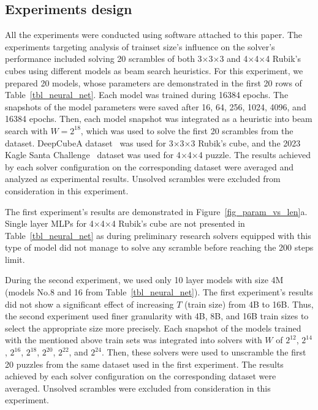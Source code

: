 
\subsection{\label{sec_exp_design}Experiments design}

All the experiments were conducted using software attached to this paper. The experiments targeting analysis of trainset size's influence on the solver's performance included solving 20 scrambles of both 3$\times$3$\times$3 and 4$\times$4$\times$4 Rubik's cubes using different models as beam search heuristics. For this experiment, we prepared 20 models, whose parameters are demonstrated in the first 20 rows of Table~\ref{tbl_neural_net}. Each model was trained during 16384 epochs. The snapshots of the model parameters were saved after 16, 64, 256, 1024, 4096, and 16384 epochs. Then, each model snapshot was integrated as a heuristic into beam search with $W=2^{18}$, which was used to solve the first 20 scrambles from the dataset. DeepCubeA dataset~\cite{agostinelli2019solving} was used for 3$\times$3$\times$3 Rubik's cube, and the 2023 Kagle Santa Challenge~\cite{santa-2023} dataset was used for 4$\times$4$\times$4 puzzle. The results achieved by each solver configuration on the corresponding dataset were averaged and analyzed as experimental results. Unsolved scrambles were excluded from consideration in this experiment.


The first experiment's results are demonstrated in Figure~\ref{fig_param_vs_len}a. Single layer MLPs for 4$\times$4$\times$4 Rubik's cube are not presented in Table~\ref{tbl_neural_net} as during preliminary research solvers equipped with this type of model did not manage to solve any scramble before reaching the 200 steps limit.

During the second experiment, we used only 10 layer models with size 4M (models No.8 and 16 from Table~\ref{tbl_neural_net}). The first experiment's results did not show a significant effect of increasing $T$ (train size) from 4B to 16B. Thus, the second experiment used finer granularity with 4B, 8B, and 16B train sizes to select the appropriate size more precisely. Each snapshot of the models trained with the mentioned above train sets was integrated into solvers with $W$ of $2^{12}$, $ 2^{14}$, $2^{16}$, $2^{18}$, $2^{20}$,  $2^{22}$, and $2^{24}$. Then, these solvers were used to unscramble the first 20 puzzles from the same dataset used in the first experiment. The results achieved by each solver configuration on the corresponding dataset were averaged. Unsolved scrambles were excluded from consideration in this experiment.

